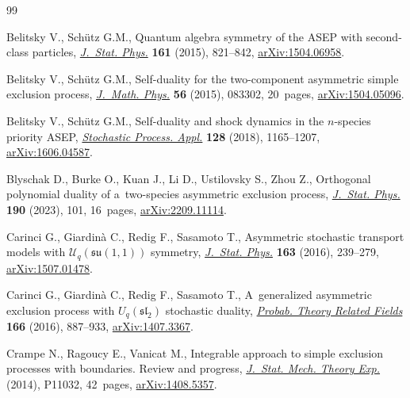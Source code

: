 \documentclass[pdftex]{sigma}
\numberwithin{equation}{section}
\theoremstyle{definition}
\begin{document}
\begin{thebibliography}{99}
\footnotesize\itemsep=0pt

Belitsky V., Sch\"utz G.M., Quantum algebra symmetry of the {ASEP} with
 second-class particles,
 \href{https://doi.org/10.1007/s10955-015-1363-1}{\textit{J.~Stat. Phys.}}
 \textbf{161} (2015), 821--842,
 \href{https://arxiv.org/abs/1504.06958}{arXiv:1504.06958}.

Belitsky V., Sch\"utz G.M., Self-duality for the two-component asymmetric
 simple exclusion process,
 \href{https://doi.org/10.1063/1.4929663}{\textit{J.~Math. Phys.}} \textbf{56}
 (2015), 083302, 20~pages,
 \href{https://arxiv.org/abs/1504.05096}{arXiv:1504.05096}.

Belitsky V., Sch\"utz G.M., Self-duality and shock dynamics in the
 {$n$}-species priority {ASEP},
 \href{https://doi.org/10.1016/j.spa.2017.07.003}{\textit{Stochastic Process.
 Appl.}} \textbf{128} (2018), 1165--1207,
 \href{https://arxiv.org/abs/1606.04587}{arXiv:1606.04587}.

Blyschak D., Burke O., Kuan J., Li D., Ustilovsky S., Zhou Z., Orthogonal
 polynomial duality of a~two-species asymmetric exclusion process,
 \href{https://doi.org/10.1007/s10955-023-03100-y}{\textit{J.~Stat. Phys.}}
 \textbf{190} (2023), 101, 16~pages,
 \href{https://arxiv.org/abs/2209.11114}{arXiv:2209.11114}.

Carinci G., Giardin\`a C., Redig F., Sasamoto T., Asymmetric stochastic
 transport models with {$\mathcal{U}_q(\mathfrak{su}(1,1))$} symmetry,
 \href{https://doi.org/10.1007/s10955-016-1473-4}{\textit{J.~Stat. Phys.}}
 \textbf{163} (2016), 239--279,
 \href{https://arxiv.org/abs/1507.01478}{arXiv:1507.01478}.

Carinci G., Giardin\`a C., Redig F., Sasamoto T., A~generalized asymmetric
 exclusion process with {$U_q(\mathfrak{sl}_2)$} stochastic duality,
 \href{https://doi.org/10.1007/s00440-015-0674-0}{\textit{Probab. Theory
 Related Fields}} \textbf{166} (2016), 887--933,
 \href{https://arxiv.org/abs/1407.3367}{arXiv:1407.3367}.

Crampe N., Ragoucy E., Vanicat M., Integrable approach to simple exclusion
 processes with boundaries. {R}eview and progress,
 \href{https://doi.org/10.1088/1742-5468/2014/11/p11032}{\textit{J.~Stat.
 Mech. Theory Exp.}} (2014), P11032, 42~pages,
 \href{https://arxiv.org/abs/1408.5357}{arXiv:1408.5357}.


\end{thebibliography}
\end{document}
